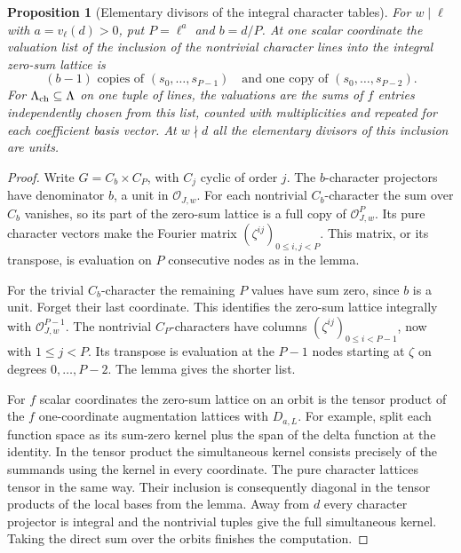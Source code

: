 \documentclass[a4paper,11pt]{article}
\newtheorem{proposition}{Proposition}[section]
\theoremstyle{definition}
\theoremstyle{remark}
\numberwithin{equation}{section}
\begin{document}
\begin{proposition}[Elementary divisors of the integral character tables]\leavevmode
\label{prop:augmentationcharacters432}
For \(w\mid\ell\) with \(a=v_\ell(d)>0\), put
\(P=\ell^a\) and \(b=d/P\). At one scalar coordinate the
valuation list of the inclusion of the nontrivial character
lines into the integral zero-sum lattice is
\[
    (b-1)\text{ copies of }(s_0,\ldots,s_{P-1})
          \quad\text{and one copy of }(s_0,\ldots,s_{P-2}).
\]
For \(\Lambda_{\rm ch}\subseteq\Lambda\) on one tuple of lines,
the valuations are the sums of \(f\) entries independently
chosen from this list, counted with multiplicities and
repeated for each coefficient basis vector. At \(w\nmid d\)
all the elementary divisors of this inclusion are units.
\end{proposition}
\begin{proof}
Write \(G=C_b\times C_P\), with \(C_j\) cyclic of order \(j\).
The \(b\)-character projectors have denominator \(b\), a unit
in \(\mathcal O_{J,w}\). For each nontrivial \(C_b\)-character
the sum over \(C_b\) vanishes, so its part of the zero-sum
lattice is a full copy of \(\mathcal O_{J,w}^{P}\).
Its pure character vectors make the Fourier matrix
\((\zeta^{ij})_{0\le i,j<P}\). This matrix, or its transpose,
is evaluation on \(P\) consecutive nodes as in the lemma.

For the trivial \(C_b\)-character the remaining \(P\) values
have sum zero, since \(b\) is a unit. Forget their last
coordinate. This identifies the zero-sum lattice integrally
with \(\mathcal O_{J,w}^{P-1}\). The nontrivial
\(C_P\)-characters have columns
\((\zeta^{ij})_{0\le i<P-1}\), now with \(1\le j<P\).
Its transpose is evaluation at the \(P-1\) nodes starting at
\(\zeta\) on degrees \(0,\ldots,P-2\). The lemma gives the
shorter list.

For \(f\) scalar coordinates the zero-sum lattice on an orbit
is the tensor product of the \(f\) one-coordinate augmentation
lattices with \(D_{a,L}\). For example, split each function
space as its sum-zero kernel plus the span of the delta
function at the identity. In the tensor product the simultaneous
kernel consists precisely of the summands using the kernel in
every coordinate. The pure character lattices tensor in the
same way. Their inclusion is consequently diagonal in the
tensor products of the local bases from the lemma. Away from
\(d\) every character projector is integral and the nontrivial
tuples give the full simultaneous kernel. Taking the direct
sum over the orbits finishes the computation.
\end{proof}
\end{document}
